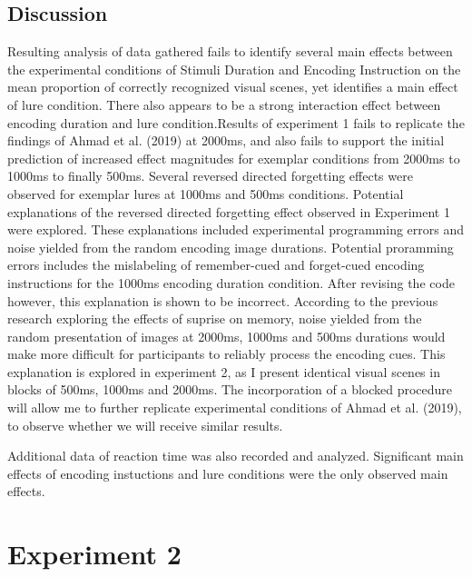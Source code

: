 \documentclass[
  english,
  man,floatsintext]{apa6}
\begin{document}
\hypertarget{discussion}{%
\subsection{Discussion}\label{discussion}}

Resulting analysis of data gathered fails to identify several main effects between the experimental conditions of Stimuli Duration and Encoding Instruction on the mean proportion of correctly recognized visual scenes, yet identifies a main effect of lure condition.
There also appears to be a strong interaction effect between encoding duration and lure condition.Results of experiment 1 fails to replicate the findings of Ahmad et al. (2019) at 2000ms, and also fails to support the initial prediction of increased effect magnitudes for exemplar conditions from 2000ms to 1000ms to finally 500ms. Several reversed directed forgetting effects were observed for exemplar lures at 1000ms and 500ms conditions. Potential explanations of the reversed directed forgetting effect observed in Experiment 1 were explored.
These explanations included experimental programming errors and noise yielded from the random encoding image durations.
Potential proramming errors includes the mislabeling of remember-cued and forget-cued encoding instructions for the 1000ms encoding duration condition. After revising the code however, this explanation is shown to be incorrect.
According to the previous research exploring the effects of suprise on memory, noise yielded from the random presentation of images at 2000ms, 1000ms and 500ms durations would make more difficult for participants to reliably process the encoding cues. This explanation is explored in experiment 2, as I present identical visual scenes in blocks of 500ms, 1000ms and 2000ms. The incorporation of a blocked procedure will allow me to further replicate experimental conditions of Ahmad et al. (2019), to observe whether we will receive similar results.

Additional data of reaction time was also recorded and analyzed. Significant main effects of encoding instuctions and lure conditions were the only observed main effects.

\hypertarget{experiment-2}{%
\section{Experiment 2}\label{experiment-2}}
\end{document}

